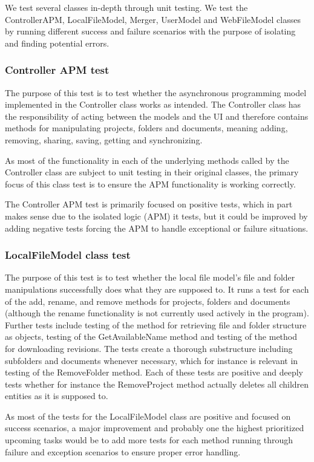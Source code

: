 We test several classes in-depth through unit testing. We test the ControllerAPM, LocalFileModel, Merger, UserModel and WebFileModel classes by running different success and failure scenarios with the purpose of isolating and finding potential errors.

\subsubsection{Controller APM test}
The purpose of this test is to test whether the asynchronous programming model implemented in the Controller class works as intended. The Controller class has the responsibility of acting between the models and the UI and therefore contains methods for manipulating projects, folders and documents, meaning adding, removing, sharing, saving, getting and synchronizing.

As most of the functionality in each of the underlying methods called by the Controller class are subject to unit testing in their original classes, the primary focus of this class test is to ensure the APM functionality is working correctly.

The Controller APM test is primarily focused on positive tests, which in part makes sense due to the isolated logic (APM) it tests, but it could be improved by adding negative tests forcing the APM to handle exceptional or failure situations.

\subsubsection{LocalFileModel class test}
The purpose of this test is to test whether the local file model's file and folder manipulations successfully does what they are supposed to. It runs a test for each of the add, rename, and remove methods for projects, folders and documents (although the rename functionality is not currently used actively in the program). Further tests include testing of the method for retrieving file and folder structure as objects, testing of the GetAvailableName method and testing of the method for downloading revisions. The tests create a thorough substructure including subfolders and documents whenever necessary, which for instance is relevant in testing of the RemoveFolder method. Each of these tests are positive and deeply tests whether for instance the RemoveProject method actually deletes all children entities as it is supposed to.

As most of the tests for the LocalFileModel class are positive and focused on success scenarios, a major improvement and probably one the highest prioritized upcoming tasks would be to add more tests for each method running through failure and exception scenarios to ensure proper error handling.


